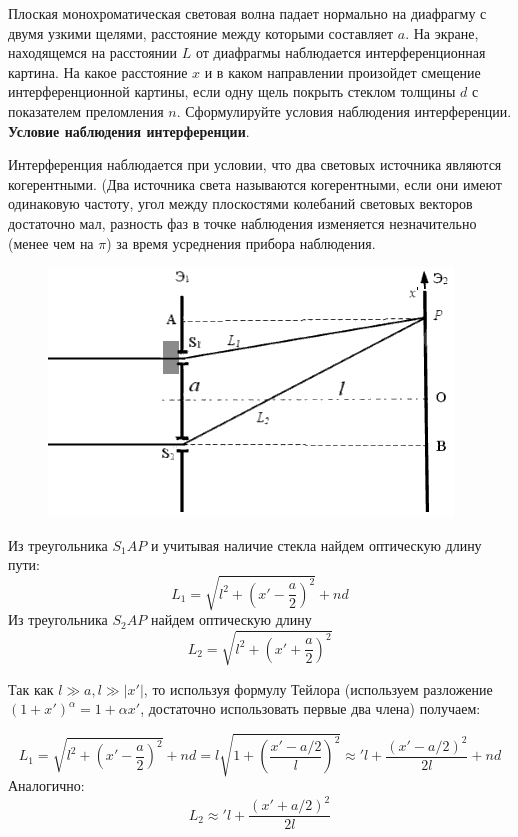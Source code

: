 \documentclass[__main__.tex]{subfiles}
\begin{document}
Плоская монохроматическая световая волна падает нормально на диафрагму с двумя узкими щелями, расстояние между которыми составляет $a$. На экране, находящемся на расстоянии $L$ от диафрагмы наблюдается интерференционная картина. На какое расстояние $x$ и в каком направлении произойдет смещение интерференционной картины, если одну щель покрыть стеклом толщины $d$ с показателем преломления $n$. Сформулируйте условия наблюдения интерференции.\\ 

\textbf{Условие наблюдения интерференции}.

Интерференция наблюдается при условии, что два световых источника являются когерентными. (Два источника света называются когерентными, если они имеют одинаковую частоту, угол между плоскостями колебаний световых векторов достаточно мал, разность фаз в точке наблюдения изменяется незначительно (менее чем на $\pi$) за время усреднения прибора наблюдения.\\

\begin{figure}
	\includegraphics[width=1\linewidth]{img/o-12_1}{}
\end{figure}

 Из треугольника $S_1AP$ и учитывая наличие стекла найдем оптическую длину пути:
 $$L_1 = \sqrt{l^2 + \left(x' - \frac{a}{2}\right)^2} + nd$$
 Из треугольника $S_2AP$ найдем оптическую длину 
 $$L_2 = \sqrt{l^2  + \left(x' + \frac{a}{2}\right)^2}$$
 
 Так как $l \gg a, l \gg |x'|$, то используя формулу Тейлора (используем разложение $(1 + x')^\alpha = 1 + \alpha x'$, достаточно использовать первые два члена) получаем:
 
 $$L_1 = \sqrt{l^2 + \left(x' - \frac{a}{2}\right)^2} + nd = l\sqrt{1 + \left(\frac{x' - a/2}{l}\right)^2} \approx' l + \frac{(x' - a/2)^2}{2l} + nd$$
 Аналогично:
 $$L_2 \approx' l + \frac{\left(x' + a/2\right)^2}{2l}$$
 
\end{document}
